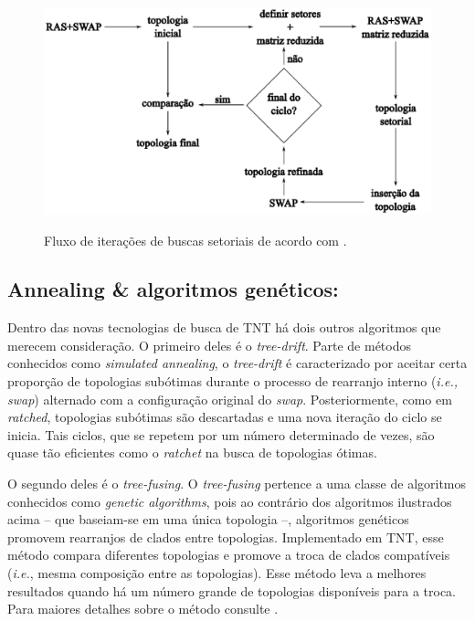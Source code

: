 \begin{refsection}



  \begin{figure}[H]
      {\includegraphics[scale=0.80]{figures/tut5/sectorial_search.eps}}
	{\caption[Fluxo de iterações de buscas setoriais.]{Fluxo de iterações de buscas setoriais de acordo com \textcite{Goloboff_1999}.}\label{tut5:fig:secsearch}}
  \end{figure}



\subsection{Annealing \& algoritmos genéticos:}

Dentro das novas tecnologias de busca de TNT há dois outros algoritmos que merecem consideração. O primeiro deles é o \textit{tree-drift}. Parte de métodos conhecidos como \textit{simulated annealing}, o \textit{tree-drift} é caracterizado por aceitar certa proporção de topologias subótimas durante o processo de rearranjo interno (\textit{i.e., swap}) alternado com a configuração original do \textit{swap}. Posteriormente, como em \textit{ratched}, topologias subótimas são descartadas e uma nova iteração do ciclo se inicia. Tais ciclos, que se repetem por um número determinado de vezes, são quase tão eficientes como o \textit{ratchet} na busca de topologias ótimas.

O segundo deles é o \textit{tree-fusing}. O \textit{tree-fusing} pertence a uma classe de algoritmos conhecidos como \textit{genetic algorithms}, pois ao contrário dos algoritmos ilustrados acima -- que baseiam-se em uma única topologia --, algoritmos genéticos promovem rearranjos de clados entre topologias. Implementado em TNT, esse método compara diferentes topologias e promove a troca de clados compatíveis (\textit{i.e.}, mesma composição entre as topologias). Esse método leva a melhores resultados quando há um número grande de topologias disponíveis para a troca. Para maiores detalhes sobre o método consulte \textcite{Giribet_2007, Goloboff_1999}.\\



\end{refsection}
